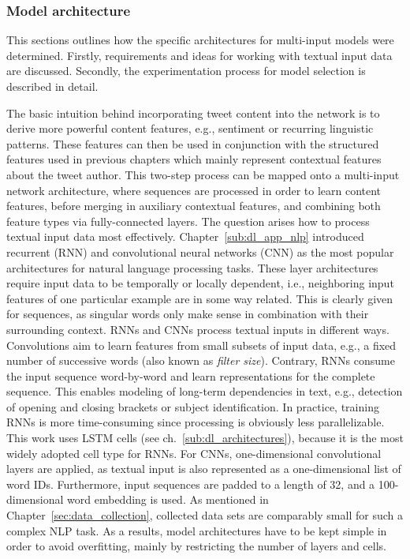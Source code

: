 \subsubsection{Model architecture}
\label{sub:comb_model_architecture}

This sections outlines how the specific architectures for multi-input models
were determined.
Firstly, requirements and ideas for working with textual input data
are discussed.
Secondly, the experimentation process for model selection is described in detail.

The basic intuition behind incorporating tweet content into the network is to
derive more powerful content features, e.g., sentiment or recurring linguistic
patterns.
These features can then be used in conjunction  with the structured features used in previous
chapters which mainly represent contextual features about the tweet author.
This two-step process can be mapped onto a multi-input network architecture,
where sequences are processed in order to learn content features, before
merging in auxiliary contextual features, and combining both feature types via fully-connected
layers.
The question arises how to process textual input data most effectively.
Chapter~\ref{sub:dl_app_nlp} introduced recurrent (RNN) and convolutional neural
networks (CNN) as the most popular architectures for natural language processing tasks.
These layer architectures require input data to be temporally or locally dependent,
i.e., neighboring input features of one particular example are in some way related.
This is clearly given for sequences, as singular words only make sense
in combination with their surrounding context.
RNNs and CNNs process textual inputs in different ways.
Convolutions aim to learn features from small subsets of input data, e.g., a
fixed number of successive words (also known as \textit{filter size}).
Contrary, RNNs consume the input sequence word-by-word and learn representations
for the complete sequence.
This enables modeling of long-term dependencies in text, e.g., detection of
opening and closing brackets or subject identification.
In practice, training RNNs is more time-consuming since processing is obviously less
parallelizable.
This work uses LSTM cells (see ch.~\ref{sub:dl_architectures}), because
it is the most widely adopted cell type for RNNs.
For CNNs, one-dimensional convolutional layers are applied, as textual input is
also represented as a one-dimensional list of word IDs.
Furthermore, input sequences are padded to a length of 32, and a 100-dimensional
word embedding is used.
As mentioned in Chapter~\ref{sec:data_collection}, collected data sets are
comparably small for such a complex NLP task.
As a results, model architectures have to be kept simple in order to avoid
overfitting, mainly by restricting the number of layers and cells.

